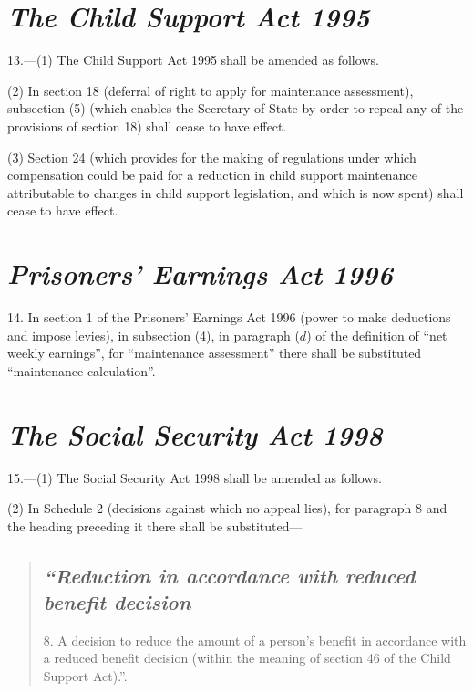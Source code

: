 \documentclass[12pt,a4paper]{article}
\begin{document}
\section*{\itshape The Child Support Act 1995}

13.---(1) The Child Support Act 1995 shall be amended as follows.

(2) In section 18 (deferral of right to apply for maintenance assessment), subsection (5)  (which enables the Secretary of State by order to repeal any of the provisions of section 18) shall cease to have effect.

(3) Section 24 (which provides for the making of regulations under which compensation could be paid for a reduction in child support maintenance attributable to changes in child support legislation, and which is now spent) shall cease to have effect.


\section*{\itshape Prisoners' Earnings Act 1996}

14. In section 1 of the Prisoners' Earnings Act 1996 (power to make deductions and impose levies), in subsection (4), in paragraph ($d$)  of the definition of “net weekly earnings”, for “maintenance assessment” there shall be substituted “maintenance calculation”.


\section*{\itshape The Social Security Act 1998}

15.---(1) The Social Security Act 1998 shall be amended as follows.

(2) In Schedule 2 (decisions against which no appeal lies), for paragraph 8 and the heading preceding it there shall be substituted—
\begin{quotation}
\subsection*{\itshape “Reduction in accordance with reduced benefit decision}

8. A decision to reduce the amount of a person’s benefit in accordance with a reduced benefit decision (within the meaning of section 46 of the Child Support Act).”.
\end{quotation}
\end{document}
